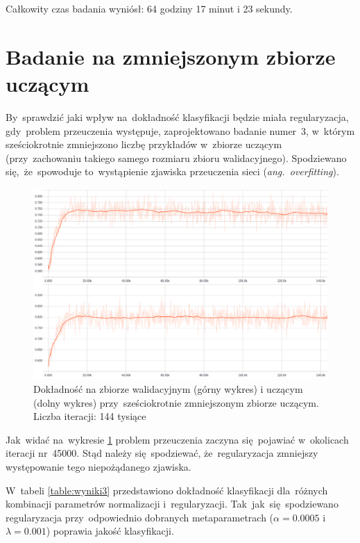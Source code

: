 Całkowity czas badania wyniósł: 64 godziny 17 minut i 23 sekundy.


\section{Badanie na zmniejszonym zbiorze uczącym}
By~sprawdzić jaki wpływ na~dokładność klasyfikacji będzie miała regularyzacja, gdy~problem przeuczenia występuje,
zaprojektowano badanie numer~3, w~którym sześciokrotnie zmniejszono liczbę przykładów w~zbiorze uczącym (przy~zachowaniu
takiego samego rozmiaru zbioru walidacyjnego). Spodziewano się,~że~spowoduje to~wystąpienie zjawiska przeuczenia sieci
(\textit{ang.~overfitting}).

\begin{figure}[H]
	\centering
	\includegraphics[width=\linewidth]{img/badanie_3.png}
	\caption{Dokładność na zbiorze walidacyjnym (górny wykres) i uczącym (dolny wykres) przy~sześciokrotnie
	         zmniejszonym zbiorze uczącym. Liczba iteracji: 144 tysiące}
	\label{rys:badanie-3}
\end{figure}

Jak~widać na~wykresie \ref{rys:badanie-3} problem przeuczenia zaczyna się~pojawiać w~okolicach iteracji nr~45000.
Stąd należy się~spodziewać, że~regularyzacja zmniejszy występowanie tego niepożądanego zjawiska.

W~tabeli \ref{table:wyniki3} przedstawiono dokładność klasyfikacji dla~różnych kombinacji parametrów normalizacji
i~regularyzacji. Tak~jak~się~spodziewano regularyzacja przy~odpowiednio dobranych metaparametrach
($\alpha=0.0005$ i~$\lambda=0.001$) poprawia jakość klasyfikacji.

